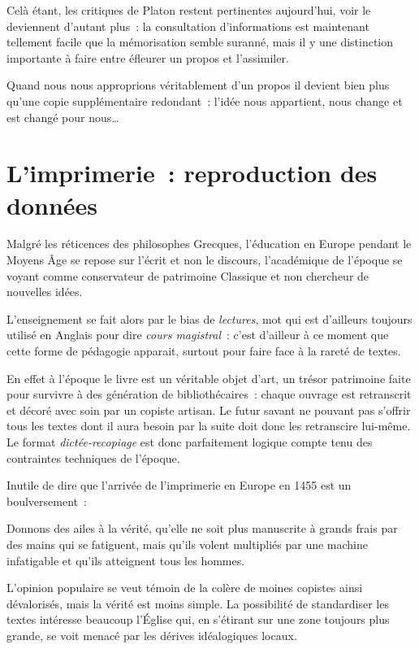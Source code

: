 Celà étant, les critiques de Platon restent pertinentes aujourd'hui, voir le deviennent d'autant plus~: la consultation d'informations est maintenant tellement facile que la mémorisation semble suranné, mais il y une distinction importante à faire entre éfleurer un propos et l'assimiler.

Quand nous nous approprions véritablement d'un propos il devient bien plus qu'une copie supplémentaire redondant~: l'idée nous appartient, nous change et est changé pour nous\ldots

\chapter{L'imprimerie~: reproduction des données}

Malgré les réticences des philosophes Grecques, l'éducation en Europe pendant le Moyens Âge se repose sur l'écrit et non le discours, l'académique de l'époque se voyant comme conservateur de patrimoine Classique et non chercheur de nouvelles idées\cite{friesen-the-lecture}.

L'enseignement se fait alors par le bias de \emph{lectures}, mot qui est d'ailleurs toujours utilisé en Anglais pour dire \emph{cours magistral}~: c'est d'ailleur à ce moment que cette forme de pédagogie apparait, surtout pour faire face à la rareté de textes.

En effet à l'époque le livre est un véritable objet d'art, un trésor patrimoine faite pour survivre à des génération de bibliothécaires~: chaque ouvrage est retranscrit et décoré avec soin par un copiste artisan. Le futur savant ne pouvant pas s'offrir tous les textes dont il aura besoin par la suite doit donc les retranscire lui-même\cite{friesen-the-lecture}. Le format \emph{dictée-recopiage} est donc parfaitement logique compte tenu des contraintes techniques de l'époque. 

Inutile de dire que l'arrivée de l'imprimerie en Europe en 1455\cite{walsham2003} est un boulversement~:

\begin{coolquote}
Donnons des ailes à la vérité, qu'elle ne soit plus manuscrite à grands frais par des mains qui se fatiguent, mais qu'ils volent multipliés par une machine infatigable et qu'ils atteignent tous les hommes.
\end{coolquote}

L'opinion populaire se veut témoin de la colère de moines copistes ainsi dévalorisés, mais la vérité est moins simple. La possibilité de standardiser les textes intéresse beaucoup l'Église qui, en s'étirant sur une zone toujours plus grande, se voit menacé par les dérives idéalogiques locaux.

